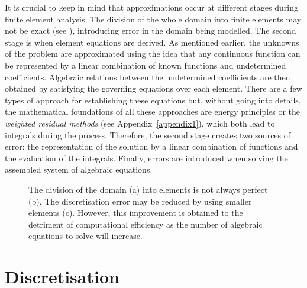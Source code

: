 It is crucial to keep in mind that approximations occur at different stages during finite element analysis. The division of the whole domain into finite elements may not be exact (see ), introducing error in the domain being modelled. The second stage is when element equations are derived. As mentioned earlier, the unknowns of the problem are approximated using the idea that any continuous function can be represented by a linear combination of known functions and undetermined coefficients. Algebraic relations between the undetermined coefficients are then obtained by satisfying the governing equations over each element. There are a few types of approach for establishing these equations but, without going into details, the mathematical foundations of all these approaches are energy principles or the \emph{weighted residual methods} (see Appendix~\ref{appendix1}), which both lead to integrals during the process. Therefore, the second stage creates two sources of error: the representation of the solution by a linear combination of functions and the evaluation of the integrals. Finally, errors are introduced when solving the assembled system of algebraic equations. 
%
\begin{figure}[ht]
\centering 
{}
\hfill 
{}
\hfill 
{}
\caption[Error introduced by the division into elements]{The division of the domain (a) into elements is not always perfect (b). The discretisation error may be reduced by using smaller elements (c). However, this improvement is obtained to the detriment of computational efficiency as the number of algebraic equations to solve will increase.}
\label{chap3:fig-errorWithSubdivision}
\end{figure}


\section{Discretisation}

